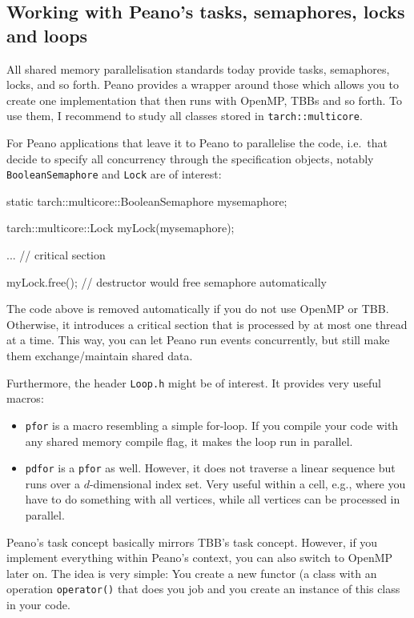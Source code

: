 \subsection{Working with Peano's tasks, semaphores, locks and loops}
\label{section:51_shared-memory:tasks}


All shared memory parallelisation standards today provide tasks, semaphores,
locks, and so forth.
Peano provides a wrapper around those which allows you to create one
implementation that then runs with OpenMP, TBBs and so forth.
To use them, I recommend to study all classes stored in
\texttt{tarch::multicore}.


For Peano applications that leave it to Peano to parallelise the code, 
i.e.~that decide to specify all concurrency through the specification 
objects, notably \texttt{BooleanSemaphore} and \texttt{Lock} are of interest:

\begin{code}
  static tarch::multicore::BooleanSemaphore  mysemaphore;
  
  
  tarch::multicore::Lock   myLock(mysemaphore);
  
  ...            // critical section
  
  myLock.free(); // destructor would free semaphore automatically
\end{code}


\noindent
The code above is removed automatically if you do not use OpenMP or TBB.
Otherwise, it introduces a critical section that is processed by at most one
thread at a time.
This way, you can let Peano run events concurrently, but still make them 
exchange/maintain shared data.


Furthermore, the header \texttt{Loop.h} might be of interest. 
It provides very useful macros:
\begin{itemize}
  \item \texttt{pfor} is a macro resembling a simple for-loop. If you compile
  your code with any shared memory compile flag, it makes the loop run in
  parallel.
  \item \texttt{pdfor} is a \texttt{pfor} as well. However, it does not traverse
  a linear sequence but runs over a $d$-dimensional index set. Very useful
  within a cell, e.g., where you have to do something with all vertices, while
  all vertices can be processed in parallel.
\end{itemize}


Peano's task concept basically mirrors TBB's task concept. 
However, if you implement everything within Peano's context, you can also switch
to OpenMP later on.
The idea is very simple: You create a new functor (a class 
with an operation \texttt{operator()} that does you job and
you create an instance of this class in your code.

